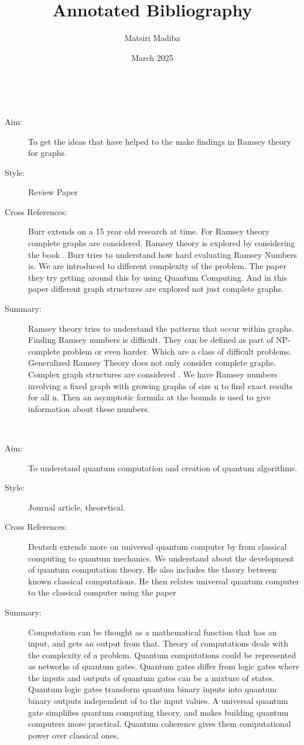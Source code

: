 \documentclass{Assignment}
\author{Matsiri Madiba}
\date{March 2025}
\title{Annotated Bibliography}
\begin{document}
\maketitle
\cite{burr1981generalized}~
\begin{description}
	\item[Aim:]
To get the ideas that have helped to the make findings in Ramsey theory for graphs.
\item[Style:]
Review Paper
\item[Cross References:]
Burr extends on a 15 year old research at time.
For Ramsey theory complete graphs are considered. 
Ramsey theory is explored by considering the book \cite{graham1980ramsey}.
Burr tries to understand how hard evaluating Ramsey Numbers is.
We are introduced to different complexity of the problem.
The paper \cite{PhysRevA.93.032301} they try getting around this by using Quantum Computing.
And in this paper different graph structures are explored not just complete graphs.
\item [Summary:]
Ramsey theory tries to understand the patterns that occur within graphs.
Finding Ramsey numbers is difficult.
They can be defined as part of NP-complete problem or even harder.
Which are a class of difficult problems.
Generalized Ramsey Theory does not only consider complete graphs.
Complex graph structures are considered .
We have Ramsey numbers involving a fixed graph with growing graphs of size n to find exact results for all n. 
Then an asymptotic formula at the bounds is used to give information about these numbers.  
\end{description}
\newpage
\cite{Deutsch1989}~
	    \begin{description}
			\item [ Aim:]
		To understand quantum computation and creation of quantum algorithms.
		\item[Style:]
		Journal article, theoretical.
		\item[Cross References:]
		Deutsch extends more on universal quantum computer by \cite{deutsch1985quantum} from classical computing to quantum mechanics. 
		We understand about the development of quantum computation theory.
		He also includes the theory between known classical computations. 
		He then relates universal quantum computer to the classical computer using the paper \cite{Turing1936}
		\item [Summary:]
		Computation can be thought as a mathematical function that has an input, and gets an output from that.
		Theory of computations deals with the complexity of a problem.
		Quantum computations could be represented as networks of quantum gates.
		Quantum gates differ from logic gates where the inputs and outputs of quantum gates can be a mixture of states.
		Quantum logic gates transform quantum binary inputs into quantum binary outputs independent of to the input values.
		A universal quantum gate simplifies quantum computing theory, and makes building quantum computers more practical. 
		Quantum coherence gives them computational power over classical ones.
	\end{description}
\end{document}
